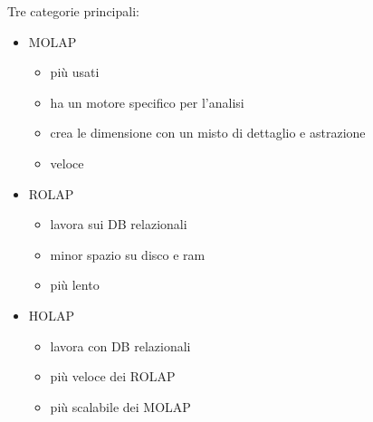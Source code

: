 Tre categorie principali:
\begin{itemize}
    \item MOLAP
    \begin{itemize}
        \item più usati
        \item ha un motore specifico per l'analisi
        \item crea le dimensione con un misto di dettaglio e astrazione
        \item veloce
    \end{itemize}
    \item ROLAP
    \begin{itemize}
        \item lavora sui DB relazionali
        \item minor spazio su disco e ram
        \item più lento
    \end{itemize}
    \item HOLAP
    \begin{itemize}
        \item lavora con DB relazionali
        \item più veloce dei ROLAP
        \item più scalabile dei MOLAP
    \end{itemize}
\end{itemize}

